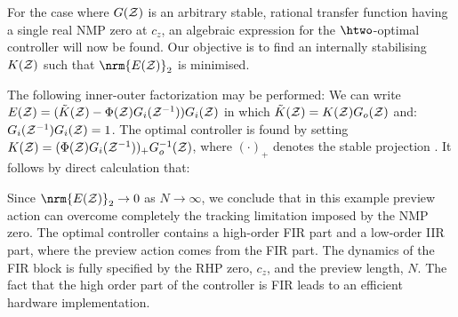 For the case where $G(\mathcal{Z})$ is an arbitrary stable, rational transfer function having a single real {NMP} zero at $c_z$, an algebraic expression for the $\htwo$-optimal controller will now be found. Our objective is to find an internally stabilising $K(\mathcal{Z})$ such that $\nrm{E(\z)}_2$ is minimised. 

The following inner-outer factorization  may be performed:
We can write $E(\mathcal{Z})= (\tilde{K}(\mathcal{Z}) -\Phi(\mathcal{Z})G_i(\mathcal{Z}^{-1}))G_i(\mathcal{Z})$ in which $\tilde{K}(\mathcal{Z})= K(\mathcal{Z}) G_o(\mathcal{Z})$ and:
\mbox{$G_i(\mathcal{Z}^{-1})G_i(\mathcal{Z})=1$}. The optimal controller is found by setting $K(\mathcal{Z}) = (\Phi(\mathcal{Z})G_i(\mathcal{Z}^{-1}))_+ G_o^{-1}(\mathcal{Z}) $, where $(\cdot)_+$ denotes the stable projection \citep{Doyle_1990_FeedbackControlTheory}. 
It follows by direct calculation  that:
%


 
Since $\nrm{E(\z)}_2\rightarrow 0$  as $N\rightarrow \infty$, we conclude that in this example preview action can overcome completely the tracking limitation
imposed by the {NMP} zero. The optimal controller contains a high-order {FIR} part and a low-order {IIR} part, where the preview action comes from the {FIR} part. The dynamics of the {FIR} block is  fully specified by the {RHP} zero, $c_z$, and the preview length, $N$. The fact that the high order part of the controller is FIR leads to an efficient hardware implementation.

